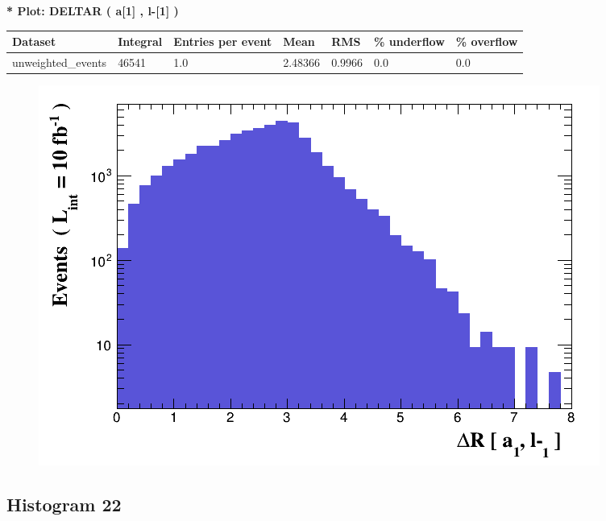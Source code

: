 \documentclass[a4paper, 10pt]{article}
\begin{document}
\textbf{* Plot: DELTAR ( a[1] , l-[1] ) }\\
   \begin{table}[H]
  \begin{center}
    \begin{tabular}{|m{23.0mm}|m{23.0mm}|m{18.0mm}|m{19.0mm}|m{19.0mm}|m{19.0mm}|m{19.0mm}|}
      \hline
      {\cellcolor{yellow}         Dataset}& {\cellcolor{yellow}         Integral}& {\cellcolor{yellow}         Entries per event}& {\cellcolor{yellow}         Mean}& {\cellcolor{yellow}         RMS}& {\cellcolor{yellow}         \% underflow}& {\cellcolor{yellow}         \% overflow}\\
      \hline
      {\cellcolor{white}         unweighted\_events}& {\cellcolor{white}         46541}& {\cellcolor{white}         1.0}& {\cellcolor{white}         2.48366}& {\cellcolor{white}         0.9966}& {\cellcolor{green}         0.0}& {\cellcolor{green}         0.0}\\
\hline
    \end{tabular}
  \end{center}
\end{table}

\begin{figure}[H]
  \begin{center}
    \includegraphics[scale=0.45]{selection_20.png}\\
\caption{   }
  \end{center}
\end{figure}
      \newpage
\subsection{ Histogram 22}
\end{document}
